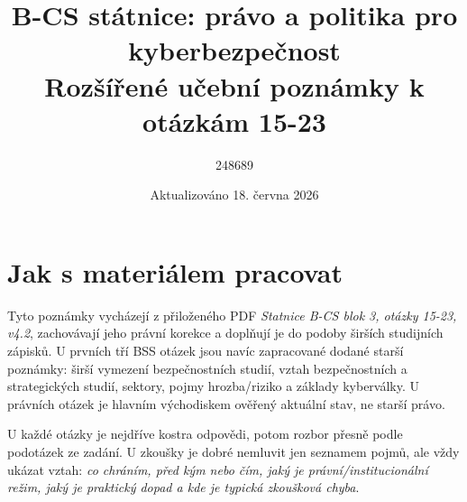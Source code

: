 \documentclass[11pt,a4paper]{article}
\title{B-CS státnice: právo a politika pro kyberbezpečnost\\\large Rozšířené učební poznámky k otázkám 15-23}
\author{248689}
\date{Aktualizováno 18. června 2026}
\begin{document}
\maketitle
\tableofcontents
\newpage

\section*{Jak s materiálem pracovat}
Tyto poznámky vycházejí z přiloženého PDF \emph{Statnice B-CS blok 3, otázky 15-23, v4.2}, zachovávají jeho právní korekce a doplňují je do podoby širších studijních zápisků. U prvních tří BSS otázek jsou navíc zapracované dodané starší poznámky: širší vymezení bezpečnostních studií, vztah bezpečnostních a strategických studií, sektory, pojmy hrozba/riziko a základy kyberválky. U právních otázek je hlavním východiskem ověřený aktuální stav, ne starší právo.

U každé otázky je nejdříve kostra odpovědi, potom rozbor přesně podle podotázek ze zadání. U zkoušky je dobré nemluvit jen seznamem pojmů, ale vždy ukázat vztah: \emph{co chráním, před kým nebo čím, jaký je právní/institucionální režim, jaký je praktický dopad a kde je typická zkoušková chyba}.
\end{document}
